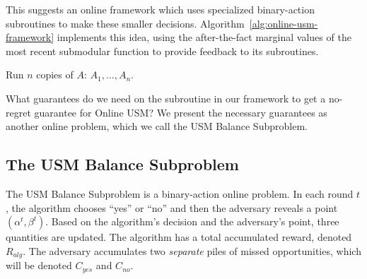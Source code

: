 \documentclass[final,12pt]{colt2018}
\newcommand{\BalanceSubproblem}{USM Balance Subproblem}
\newcommand{\OnlineUSM}{Online USM}
\newcommand{\RewardAlg}{R_{alg}}
\newcommand{\CostYes}{C_{yes}}
\newcommand{\CostNo}{C_{no}}
\begin{document}
This suggests an online framework which uses specialized binary-action subroutines to make these smaller decisions. Algorithm~\ref{alg:online-usm-framework} implements this idea, using the after-the-fact marginal values of the most recent submodular function to provide feedback to its subroutines.

\begin{algorithm}
\caption{\OnlineUSM{} Framework.}
\label{alg:online-usm-framework}
\vspace{.5\baselineskip}

  Run $n$ copies of $A$: $A_1, \ldots, A_n$. \\
\end{algorithm}

What guarantees do we need on the subroutine in our framework to get a no-regret guarantee for \OnlineUSM{}? We present the necessary guarantees as another online problem, which we call the \BalanceSubproblem{}.

\subsection{The \BalanceSubproblem{}}

The \BalanceSubproblem{} is a binary-action online problem. In each
round $t$, the algorithm chooses ``yes'' or ``no'' and then the
adversary reveals a point $(\alpha^t, \beta^t)$. Based on the
algorithm's decision and the adversary's point, three quantities are
updated. The algorithm has a total accumulated reward, denoted
$\RewardAlg$. The adversary accumulates two \emph{separate} piles of
missed opportunities, which will be denoted $\CostYes$ and $\CostNo$.
\end{document}
